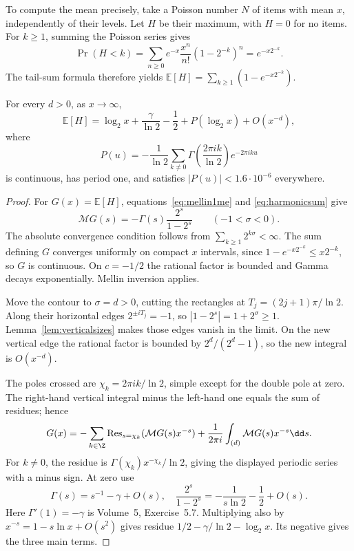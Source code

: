 To compute the mean precisely, take a Poisson number $N$ of items with mean $x$, independently of their levels. Let $H$ be their maximum, with $H=0$ for no items. For $k\ge1$, summing the Poisson series gives
\[\Pr(H<k)=\sum_{n\ge0}e^{-x}\frac{x^n}{n!}(1-2^{-k})^n=e^{-x2^{-k}}.
\]
The tail-sum formula therefore yields $\mathbb E[H]=\sum_{k\ge1}(1-e^{-x2^{-k}})$.

\begin{theorem}\label{thm:maxgeom}
For every $d>0$, as $x\to\infty$,
\[\mathbb E[H]=\log_2x+\frac\gamma{\ln2}-\frac12+P(\log_2x)+O(x^{-d}),\]
where
\[P(u)=-\frac1{\ln2}\sum_{k\ne0}\Gamma\left(\frac{2\pi ik}{\ln2}\right)e^{-2\pi iku}\]
is continuous, has period one, and satisfies $|P(u)|<1.6\cdot10^{-6}$ everywhere.
\end{theorem}
\begin{proof}
For $G(x)=\mathbb E[H]$, equations~\eqref{eq:mellin1me} and \eqref{eq:harmonicsum} give
\[\mathcal MG(s)=-\Gamma(s)\frac{2^s}{1-2^s}\qquad(-1<\sigma<0).
\]
The absolute convergence condition follows from $\sum_{k\ge1}2^{k\sigma}<\infty$. The sum defining $G$ converges uniformly on compact $x$ intervals, since $1-e^{-x2^{-k}}\le x2^{-k}$, so $G$ is continuous. On $c=-1/2$ the rational factor is bounded and Gamma decays exponentially. Mellin inversion applies.

Move the contour to $\sigma=d>0$, cutting the rectangles at $T_j=(2j+1)\pi/\ln2$. Along their horizontal edges $2^{\pm iT_j}=-1$, so $|1-2^s|=1+2^\sigma\ge1$. Lemma~\ref{lem:verticalsizes} makes those edges vanish in the limit. On the new vertical edge the rational factor is bounded by $2^d/(2^d-1)$, so the new integral is $O(x^{-d})$.

The poles crossed are $\chi_k=2\pi ik/\ln2$, simple except for the double pole at zero. The right-hand vertical integral minus the left-hand one equals the sum of residues; hence
\[G(x)=-\sum_{k\in\Z}\operatorname{Res}_{s=\chi_k}(\mathcal MG(s)x^{-s})
 +\frac1{2\pi i}\int_{(d)}\mathcal MG(s)x^{-s}\dd s.
\]
For $k\ne0$, the residue is $\Gamma(\chi_k)x^{-\chi_k}/\ln2$, giving the displayed periodic series with a minus sign. At zero use
\[\Gamma(s)=s^{-1}-\gamma+O(s),\quad
\frac{2^s}{1-2^s}=-\frac1{s\ln2}-\frac12+O(s).
\]
Here $\Gamma'(1)=-\gamma$ is Volume~5, Exercise~5.7. Multiplying also by $x^{-s}=1-s\ln x+O(s^2)$ gives residue $1/2-\gamma/\ln2-\log_2x$. Its negative gives the three main terms.


\end{proof}
